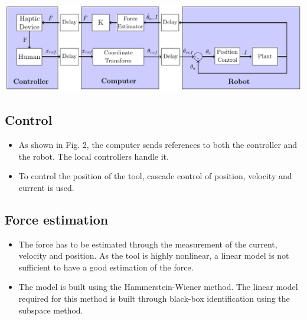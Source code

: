 \begin{center}
\includegraphics[width=\textwidth]{../Worksheets/rapport/pictures/control.pdf} 
	
	\vspace{-2mm}
	\captionsetup{font=tiny}
\end{center}




\begin{minipage}{0.45\linewidth}
\subsection*{Control}
\begin{itemize}
\item As shown in Fig. 2, the computer sends references to both the controller and the robot. The local controllers handle it.
\item To control the position of the tool, cascade control of position, velocity and current is used.
\end{itemize}
\end{minipage}
\hspace{5mm}
\begin{minipage}{0.45\linewidth}
\subsection*{Force estimation}
\begin{itemize}
	\item The force has to be estimated through the measurement of the current, velocity and position. As the tool is highly nonlinear, a linear model is not sufficient to have a good estimation of the force.
	\item The model is built using the Hammerstein-Wiener method. The linear model required for this method is built through black-box identification using the subspace method.
\end{itemize}
\end{minipage}
